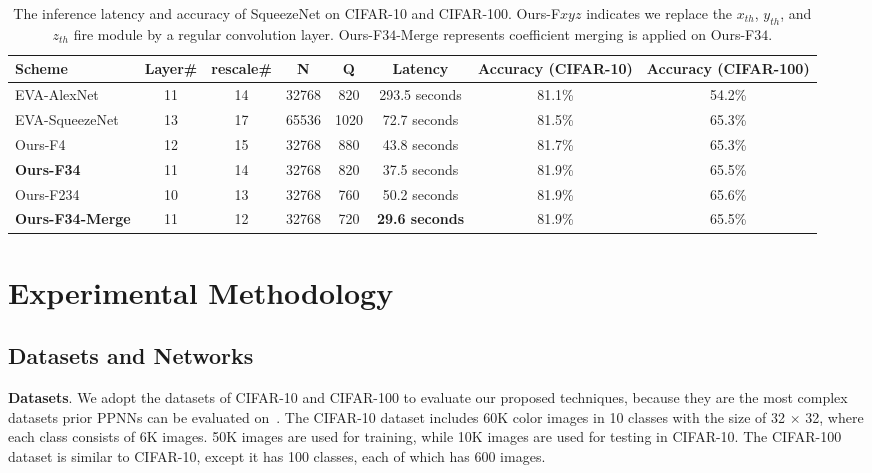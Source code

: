 \documentclass{article}
\begin{document}
	
	
	
	
	
	
	\begin{table*}[t!]
	\centering
	\small
	\begin{tabular}{|l||c|c|c|c|c|c|c|} \hline
			Scheme                & Layer\# & rescale\# &N     &Q            & Latency                 & Accuracy (CIFAR-10)  & Accuracy (CIFAR-100)           \\\hline\hline
			EVA-AlexNet           & 11      & 14        &32768 & 820         & 293.5 seconds           & 81.1\%             & 54.2\%                      \\\hline
			EVA-SqueezeNet        & 13      & 17        &65536 & 1020        & 72.7 seconds            & 81.5\%             & 65.3\%                       \\\hline
			Ours-F4               & 12      & 15        &32768 & 880         & 43.8 seconds            & 81.7\%             & 65.3\%                       \\\hline
			\textbf{Ours-F34}     & 11      & 14        &32768 & 820         & 37.5 seconds            & 81.9\%             & 65.5\%                       \\\hline
			Ours-F234             & 10      & 13        &32768 & 760         & 50.2 seconds            & 81.9\%  			  & 65.6\%                        \\\hline
		\textbf{Ours-F34-Merge}   & 11      & 12        &32768 & 720         & \textbf{29.6 seconds}   & 81.9\%  			  &	65.5\%						\\\hline	
	\end{tabular}
	\caption{The inference latency and accuracy of SqueezeNet on CIFAR-10 and CIFAR-100. Ours-F$xyz$ indicates we replace the $x_{th}$, $y_{th}$, and $z_{th}$ fire module by a regular convolution layer. Ours-F$34$-Merge represents coefficient merging is applied on Ours-F$34$.}
	\label{t:SqueezeNet}
	\end{table*}
	
	
	\section{Experimental Methodology}
	
	
\subsection{Datasets and Networks}

\textbf{Datasets}. We adopt the datasets of CIFAR-10 and CIFAR-100 to evaluate our proposed techniques, because they are the most complex datasets prior PPNNs can be evaluated on~\cite{dathathri:2019PLDI,Dathathri:PLDI20:EVA}. The CIFAR-10 dataset includes 60K color images in 10 classes with the size of 32 $\times$ 32, where each class consists of 6K images. 50K images are used for training, while 10K images are used for testing in CIFAR-10. The CIFAR-100 dataset is similar to CIFAR-10, except it has 100 classes, each of which has 600 images. 
\end{document}
